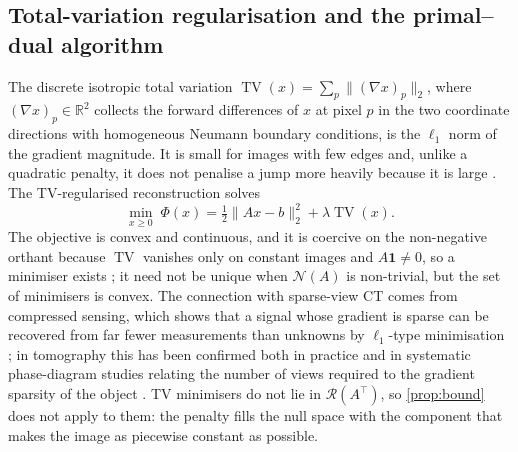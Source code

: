 \documentclass[11pt,a4paper]{article}
\numberwithin{equation}{section}
\theoremstyle{remark}
\DeclareMathOperator{\TV}{TV}
\newcommand{\R}{\mathbb{R}}
\newcommand{\RR}{\mathcal{R}}
\newcommand{\NN}{\mathcal{N}}
\newcommand{\T}{\top}
\begin{document}
\subsection{Total-variation regularisation and the primal--dual algorithm}\label{sec:methods-tv}

The discrete isotropic total variation $\TV(x)=\sum_p\|(\nabla x)_p\|_2$, where $(\nabla x)_p\in\R^2$ collects the forward differences of $x$ at pixel $p$ in the two coordinate directions with homogeneous Neumann boundary conditions, is the $\ell_1$ norm of the gradient magnitude. It is small for images with few edges and, unlike a quadratic penalty, it does not penalise a jump more heavily because it is large \citep{rudin1992}. The TV-regularised reconstruction solves
\begin{equation}\label{eq:tv}
  \min_{x\ge0}\;\Phi(x)=\tfrac12\|Ax-b\|_2^2+\lambda\TV(x).
\end{equation}
The objective is convex and continuous, and it is coercive on the non-negative orthant because $\TV$ vanishes only on constant images and $A\mathbf 1\ne0$, so a minimiser exists \citep{acar1994}; it need not be unique when $\NN(A)$ is non-trivial, but the set of minimisers is convex. The connection with sparse-view CT comes from compressed sensing, which shows that a signal whose gradient is sparse can be recovered from far fewer measurements than unknowns by $\ell_1$-type minimisation \citep{candes2006}; in tomography this has been confirmed both in practice \citep{sidky2008} and in systematic phase-diagram studies relating the number of views required to the gradient sparsity of the object \citep{jorgensen2015}. TV minimisers do not lie in $\RR(A^\T)$, so \cref{prop:bound} does not apply to them: the penalty fills the null space with the component that makes the image as piecewise constant as possible.
\end{document}
